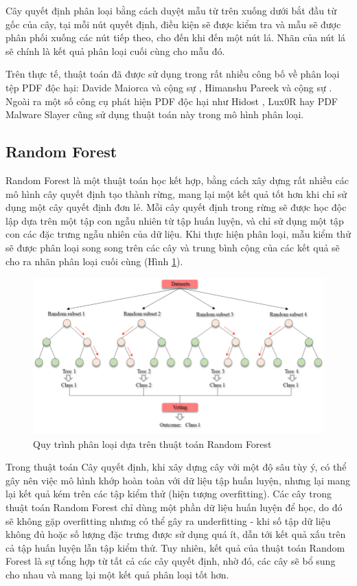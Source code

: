 \documentclass[./../main.tex]{subfiles}
\begin{document}
Cây quyết định phân loại bằng cách duyệt mẫu từ trên xuống dưới bắt đầu từ gốc của cây, tại mỗi nút quyết định, điều kiện sẽ được kiểm tra và mẫu sẽ được phân phối xuống các nút tiếp theo, cho đến khi đến một nút lá. Nhãn của nút lá sẽ chính là kết quả phân loại cuối cùng cho mẫu đó.

Trên thực tế, thuật toán đã được sử dụng trong rất nhiều công bố về phân loại tệp PDF độc hại: Davide Maiorca và cộng sự \cite{davide}, Himanshu Pareek và cộng sự \cite{himanshu}. Ngoài ra một số công cụ phát hiện PDF độc hại như Hidost \cite{hidost}, Lux0R \cite{luxor} hay PDF Malware Slayer \cite{slayer} cũng sử dụng thuật toán này trong mô hình phân loại.

\subsection{Random Forest}

Random Forest là một thuật toán học kết hợp, bằng cách xây dựng rất nhiều các mô hình cây quyết định tạo thành rừng, mang lại một kết quả tốt hơn khi chỉ sử dụng một cây quyết định đơn lẻ. Mỗi cây quyết định trong rừng sẽ được học độc lập dựa trên một tập con ngẫu nhiên từ tập huấn luyện, và chỉ sử dụng một tập con các đặc trưng ngẫu nhiên của dữ liệu. Khi thực hiện phân loại, mẫu kiểm thử sẽ được phân loại song song trên các cây và trung bình cộng của các kết quả sẽ cho ra nhãn phân loại cuối cùng (Hình \ref{fig:img_rf_flow}).

\begin{figure}[ht!]
	\centering
	\includegraphics[width=\linewidth]{./images/img_rf_flow.png}
	\caption{Quy trình phân loại dựa trên thuật toán Random Forest \cite{randomforest}}
	\label{fig:img_rf_flow}
\end{figure}

Trong thuật toán Cây quyết định, khi xây dựng cây với một độ sâu tùy ý, có thể gây nên việc mô hình khớp hoàn toàn với dữ liệu tập huấn luyện, nhưng lại mang lại kết quả kém trên các tập kiểm thử (hiện tượng overfitting). Các cây trong thuật toán Random Forest chỉ dùng một phần dữ liệu huấn luyện để học, do đó sẽ không gặp overfitting nhưng có thể gây ra underfitting - khi số tập dữ liệu không đủ hoặc số lượng đặc trưng được sử dụng quá ít, dẫn tới kết quả xấu trên cả tập huấn luyện lẫn tập kiểm thử. Tuy nhiên, kết quả của thuật toán Random Forest là sự tổng hợp từ tất cả các cây quyết định, nhờ đó, các cây sẽ bổ sung cho nhau và mang lại một kết quả phân loại tốt hơn.
\end{document}
